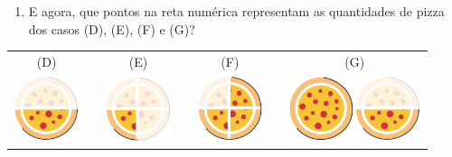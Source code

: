 \begin{atividade}{}
\begin{enumerate} [\quad a)]
\item  E agora, que pontos na reta numérica representam as quantidades de pizza dos casos (D), (E), (F) e (G)? 
\end{enumerate} 

\begin{center}
\begin{tabular}{ccccccc}
(D)&\quad\quad\quad & (E) &\quad\quad\quad&  (F) &\quad\quad\quad&  (G) \\
 \includegraphics[width=55pt, keepaspectratio]{../figuras/licao03/ativ2_fig_b_meia_pizza.png} & & \includegraphics[width=55pt, keepaspectratio]{../figuras/licao03/ativ2_fig_b_quarto_pizza.png} & &\includegraphics[width=55pt, keepaspectratio]{../figuras/licao03/ativ2_fig_b_tres_quartos_pizza.png} & &\includegraphics[width=55pt, keepaspectratio]{../figuras/licao03/pizza.png}\includegraphics[width=55pt, keepaspectratio]{../figuras/licao03/ativ2_fig_b_meia_pizza.png}
\end{tabular}
\end{center}

\end{atividade}

